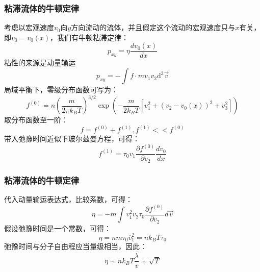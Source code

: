 \documentclass{if-beamer}
\begin{document}
\begin{frame}
    \frametitle{粘滞流体的牛顿定律}
    
        考虑以宏观速度$v_0$向$y$方向流动的流体，并且假定这个流动的宏观速度只与$x$有关，即$v_0=v_0(x)$，我们有牛顿粘滞定律：
        \begin{equation*}
            p_{xy}=\eta\frac{dv_0(x)}{dx}
        \end{equation*}
        粘性的来源是动量输运
        \begin{equation*}
            p_{xy}=-\int{f\cdot mv_1v_2\mathrm{d}^3\vec{v}}
        \end{equation*}
        局域平衡下，零级分布函数可写为：
        \begin{equation*}
            f^{(0)}=n\left(\frac{m}{2 \pi k_{B} T}\right)^{3 / 2} \exp \left(-\frac{m}{2 k_{B} T}\left[v_{1}^{2}+\left(v_{2}-v_{0}(x)\right)^{2}+v_{3}^{2}\right]\right)
        \end{equation*}
        取分布函数至一阶：
        \begin{equation*}
            f=f^{(0)}+f^{(1)},f^{(1)}<<f^{(0)}
        \end{equation*}
        带入弛豫时间近似下玻尔兹曼方程，可得：
        \begin{equation*}
            f^{(1)}=\tau_{0} v_{1} \frac{\partial f^{(0)}}{\partial v_{2}} \frac{d v_{0}}{d x}
        \end{equation*}


\end{frame}
\begin{frame}
    \frametitle{粘滞流体的牛顿定律}
        代入动量输运表达式，比较系数，可得：
        \begin{equation*}
            \eta=-m \int v_{1}^{2} v_{2} \tau_{0} \frac{\partial f^{(0)}}{\partial v_{2}} d \vec{v}
        \end{equation*}
        假设弛豫时间是一个常数，可得：
        \begin{equation*}
            \eta=n m {\tau}_{0} \overline{v}_{1}^{2}=n k_{B} T {\tau}_{0}
        \end{equation*}
        弛豫时间与分子自由程应当量级相当，因此：
        \begin{equation*}
            \eta \sim n k_{B} T \frac{\overline{\lambda}}{\overline{v}}\sim\sqrt{T}
        \end{equation*}

\end{frame}
\end{document}
